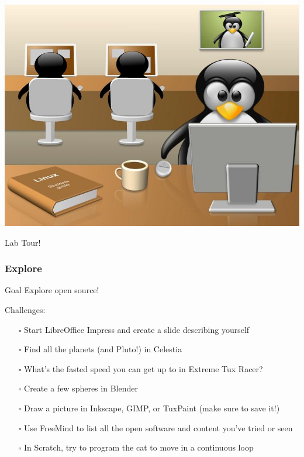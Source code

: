 \documentclass{beamer}
\begin{document}
\begin{frame}
  \begin{center}
    \includegraphics[height=0.5\textheight]{../img/linux-lab}    

    \vspace{1em}

    \begin{Huge}
      Lab Tour!
    \end{Huge}
  \end{center}
\end{frame}

\begin{frame}
  \frametitle{Explore}
  \begin{block}{Goal}
    Explore open source!
  \end{block}

  Challenges:
  \begin{itemize}
  \item[$\square$] Start \textcolor{beamer@mygreen}{LibreOffice Impress} and create a slide
    describing yourself
  \item[$\square$] Find all the planets (and Pluto!) in
    \textcolor{beamer@mygreen}{Celestia}
  \item[$\square$] What's the fasted speed you can get up to in
    \textcolor{beamer@mygreen}{Extreme Tux Racer}?
  \item[$\square$] Create a few spheres in \textcolor{beamer@mygreen}{Blender}
  \item[$\square$] Draw a picture in
    \textcolor{beamer@mygreen}{Inkscape},
    \textcolor{beamer@mygreen}{GIMP}, or
    \textcolor{beamer@mygreen}{TuxPaint} (make sure to save it!)
  \item[$\square$] Use \textcolor{beamer@mygreen}{FreeMind} to list all the open software and content you've tried or seen
  \item[$\square$] In \textcolor{beamer@mygreen}{Scratch}, try to program the cat to move in a continuous loop

  \end{itemize}

\end{frame}
\end{document}
